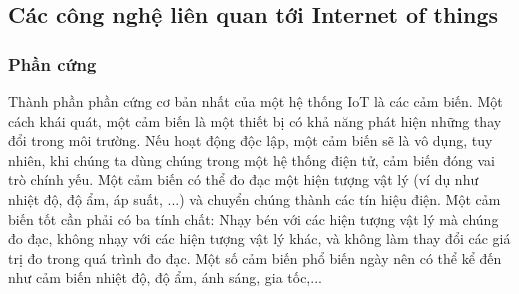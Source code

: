 \subsection{Các công nghệ liên quan tới Internet of things}
\subsubsection{Phần cứng}
Thành phần phần cứng cơ bản nhất của một hệ thống IoT là các cảm biến. Một cách khái quát, một cảm biến là một thiết bị có khả năng phát hiện những thay đổi trong môi trường. Nếu hoạt động độc lập, một cảm biến sẽ là vô dụng, tuy nhiên, khi chúng ta dùng chúng trong một hệ thống điện tử, cảm biến đóng vai trò chính yếu. Một cảm biến  có thể đo đạc một hiện tượng vật lý (ví dụ như nhiệt độ, độ ẩm, áp suất, ...) và chuyển chúng thành các tín hiệu điện. Một cảm biến tốt cần phải có ba tính chất: Nhạy bén với các hiện tượng vật lý mà chúng đo đạc, không nhạy với các hiện tượng vật lý khác, và không làm thay đổi các giá trị đo trong quá trình đo đạc. Một số cảm biến phổ biến ngày nên có thể kể đến như cảm biến nhiệt độ, độ ẩm, ánh sáng, gia tốc,...\\ %

